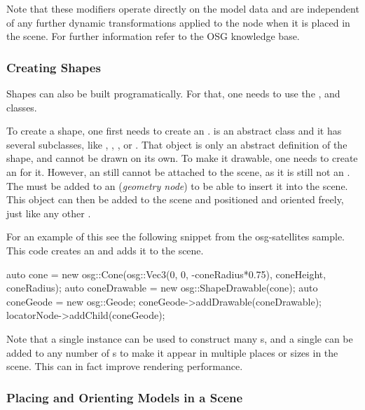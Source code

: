 Note that these modifiers operate directly on the model data and are
independent of any further dynamic transformations applied to the node when
it is placed in the scene. For further information refer to the OSG
knowledge base.

\subsubsection{Creating Shapes}
\label{sec:graphics:osg-creating-shapes}

Shapes can also be built programatically. For that, one needs to use the
,  and 
classes.

To create a shape, one first needs to create an .
 is an abstract class and it has several subclasses, like
, , ,
 or . That object is only an abstract
definition of the shape, and cannot be drawn on its own. To make it drawable,
one needs to create an  for it. However, an
 still cannot be attached to the scene, as it is still
not an . The  must be added to an
 (\textit{geometry node}) to be able to insert it into the
scene. This object can then be added to the scene and positioned and oriented
freely, just like any other .

For an example of this see the following snippet from the osg-satellites
sample. This code creates an  and adds it to the scene.

\begin{cpp}
auto cone = new osg::Cone(osg::Vec3(0, 0, -coneRadius*0.75),
                          coneHeight, coneRadius);
auto coneDrawable = new osg::ShapeDrawable(cone);
auto coneGeode = new osg::Geode;
coneGeode->addDrawable(coneDrawable);
locatorNode->addChild(coneGeode);
\end{cpp}

Note that a single  instance can be used to construct many
s, and a single  can be
added to any number of s to make it appear in multiple
places or sizes in the scene. This can in fact improve rendering performance.

\subsubsection{Placing and Orienting Models in a Scene}
\label{sec:graphics:osg-placing-and-orienting-models}

